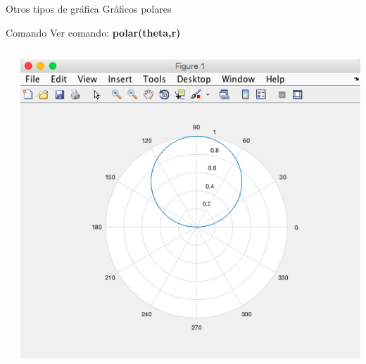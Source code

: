 \documentclass{bredelebeamer}
\begin{document}
\begin{frame}{Otros tipos de gráfica}
Gráficos polares
\begin{exampleblock}{Comando}
Ver comando: \textbf{polar(theta,r)}
\end{exampleblock}
\begin{columns}
\begin{column}{0.5\textwidth}

\end{column}
\begin{column}{0.5\textwidth}
\begin{center}
\includegraphics[scale=0.2]{images/pantalla22.png}
\end{center}
\end{column}
\end{columns}
\end{frame}
\end{document}
